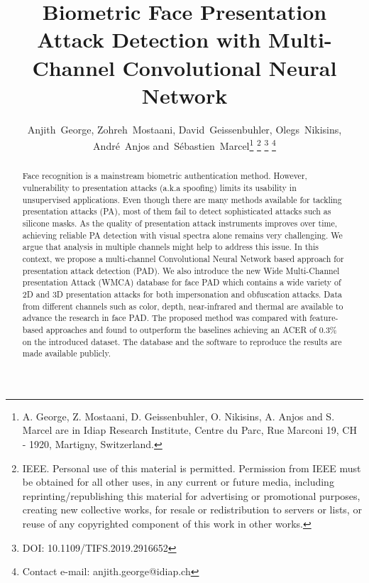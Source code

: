 \documentclass[journal]{IEEEtran}
\begin{document}
\title{Biometric Face Presentation Attack Detection with Multi-Channel Convolutional Neural Network}


\author{Anjith~George, Zohreh~Mostaani, David~Geissenbuhler, Olegs~Nikisins, Andr{\'e}~Anjos
        and~S{\'e}bastien~Marcel\thanks{A. George, Z. Mostaani, D. Geissenbuhler, O. Nikisins, A. Anjos and S. Marcel are in Idiap Research Institute, Centre du Parc, Rue Marconi 19, CH - 1920, Martigny, Switzerland. }
\thanks{ IEEE.  Personal use of this material is permitted.  Permission from IEEE must be obtained for all other uses, in any current or future media, including reprinting/republishing this material for advertising or promotional purposes, creating new collective works, for resale or redistribution to servers or lists, or reuse of any copyrighted component of this work in other works.}
\thanks{DOI: 10.1109/TIFS.2019.2916652}
\thanks{Contact e-mail: anjith.george@idiap.ch}
}


\markboth{}{}



\maketitle

\begin{abstract}
Face recognition is a mainstream biometric authentication method. However, vulnerability to presentation attacks (a.k.a spoofing) limits its usability in unsupervised applications. Even though there are many methods available for tackling presentation attacks (PA), most of them fail to detect sophisticated attacks such as silicone masks.
As the quality of presentation attack instruments improves over time, achieving reliable PA detection with visual spectra alone remains very challenging. We argue that analysis in multiple channels might help to address this issue.  In this context, we propose a multi-channel Convolutional Neural Network based approach for presentation attack detection (PAD).
We also introduce the new Wide Multi-Channel presentation Attack (WMCA) database for face PAD which contains a wide variety of 2D and 3D presentation attacks for both impersonation and obfuscation attacks. Data from different channels such as color, depth, near-infrared and thermal are available to advance the research in face PAD. The proposed method was compared with feature-based approaches and found to outperform the baselines achieving an ACER of 0.3\% on the introduced dataset. The database and the software to reproduce the results are made available publicly.


\end{abstract}
\end{document}
